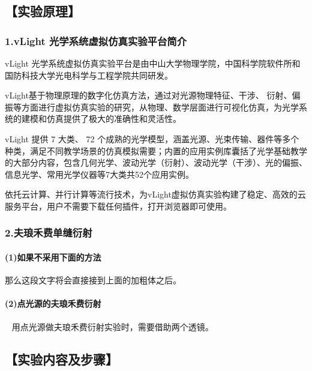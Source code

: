 \documentclass[12pt,a4paper,UTF8]{ctexart}
\begin{document}
\subsection*{【实验原理】}

	\subsubsection*{1.vLight 光学系统虚拟仿真实验平台简介}
	vLight 光学系统虚拟仿真实验平台是由中山大学物理学院，中国科学院软件所和国防科技大学光电科学与工程学院共同研发。\par
	vLight基于物理原理的数字化仿真方法，通过对光源物理特征、干涉、 衍射、偏振等方面进行虚拟仿真实验的研究，从物理、数学层面进行可视化仿真，为光学系统的建模和仿真提供了极大的准确性和灵活性。 \par
	vLight 提供 7 大类、 72 个成熟的光学模型，涵盖光源、光束传输、器件等多个种类，满足不同教学场景的仿真模拟需要；内置的应用实例库囊括了光学基础教学的大部分内容，包含几何光学、波动光学（衍射）、波动光学（干涉）、光的偏振、信息光学、常用光学仪器等7大类共52个应用实例。\par
	依托云计算、并行计算等流行技术，为vLight虚拟仿真实验构建了稳定、高效的云服务平台，用户不需要下载任何插件，打开浏览器即可使用。


	\subsubsection*{2.夫琅禾费单缝衍射}
	\paragraph{(1)如果不采用下面的方法}
	那么这段文字将会直接接到上面的加粗体之后。
	\paragraph{(2)点光源的夫琅禾费衍射}~
	\newline %
	\indent 用点光源做夫琅禾费衍射实验时，需要借助两个透镜。


\subsection*{【实验内容及步骤】}
\end{document}
